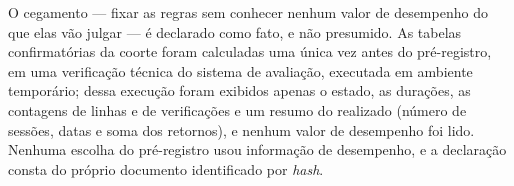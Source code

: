 O cegamento --- fixar as regras sem conhecer nenhum valor de desempenho do que elas vão julgar --- é declarado como fato, e não presumido. As tabelas confirmatórias da coorte foram calculadas uma única vez antes do pré-registro, em uma verificação técnica do sistema de avaliação, executada em ambiente temporário; dessa execução foram exibidos apenas o estado, as durações, as contagens de linhas e de verificações e um resumo do realizado (número de sessões, datas e soma dos retornos), e nenhum valor de desempenho foi lido. Nenhuma escolha do pré-registro usou informação de desempenho, e a declaração consta do próprio documento identificado por \textit{hash}.
